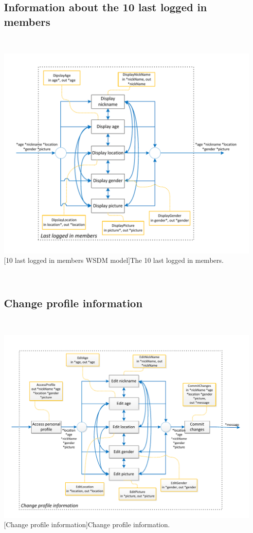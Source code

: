 \documentclass[11pt, a4paper,svglistings,oneside]{book}
\begin{document}
\subsection{Information about the 10 last logged in members}

$\;$ \\
\noindent\begin{minipage}{\textwidth}
    \centering
   \includegraphics[scale=1]{Nav_LastLoggedInMembers.pdf}
 [10 last logged in members WSDM model]{The 10 last logged in members.}
\end{minipage}
$\;$ \\ 

\subsection{Change profile information}

$\;$ \\
\noindent\begin{minipage}{\textwidth}
    \centering
   \includegraphics[scale=1]{Nav_ChangeProfileInformation.pdf}
 [Change profile information]{Change profile information.}
\end{minipage}
$\;$ \\ 
\end{document}

